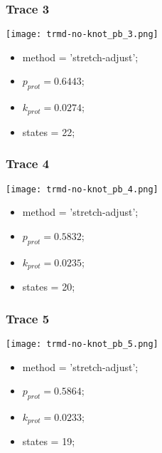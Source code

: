\begin{minipage}[c]{0.45\textwidth}
\subsubsection{Trace 3}
\begin{minipage}[c]{0.7\textwidth}
    \texttt{[image: trmd-no-knot\_pb\_3.png]}
\end{minipage}
\hfill
\begin{minipage}[c]{0.45\textwidth}
    \begin{itemize}
        \item method = 'stretch-adjust';
        \item $p_{prot}=0.6443$;
        \item $k_{prot}=0.0274$;
        \item states = 22;
    \end{itemize}
\end{minipage}

\subsubsection{Trace 4}
\begin{minipage}[c]{0.7\textwidth}
    \texttt{[image: trmd-no-knot\_pb\_4.png]}
\end{minipage}
\hfill
\begin{minipage}[c]{0.45\textwidth}
    \begin{itemize}
        \item method = 'stretch-adjust';
        \item $p_{prot}=0.5832$;
        \item $k_{prot}=0.0235$;
        \item states = 20;
    \end{itemize}
\end{minipage}

\subsubsection{Trace 5}
\begin{minipage}[c]{0.7\textwidth}
    \texttt{[image: trmd-no-knot\_pb\_5.png]}
\end{minipage}
\hfill
\begin{minipage}[c]{0.45\textwidth}
    \begin{itemize}
        \item method = 'stretch-adjust';
        \item $p_{prot}=0.5864$;
        \item $k_{prot}=0.0233$;
        \item states = 19;
    \end{itemize}
\end{minipage}


\end{minipage}
